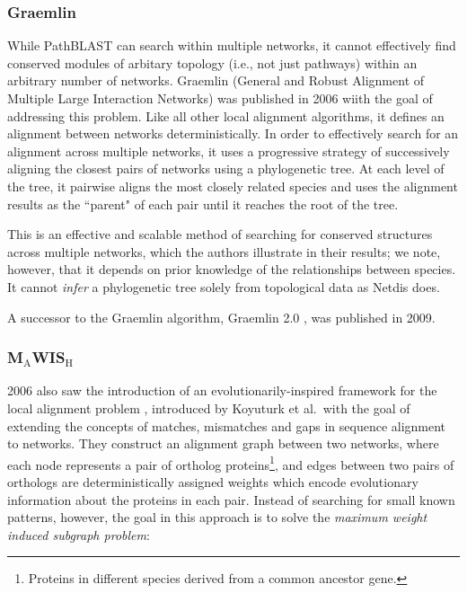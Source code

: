 \documentclass[12pt]{thesis}
\theoremstyle{plain}
\theoremstyle{definition}
\theoremstyle{remark}
\begin{document}
\subsubsection{Graemlin} While PathBLAST can search within multiple networks, it cannot effectively find conserved modules of arbitary topology (i.e., not just pathways) within an arbitrary number of networks. Graemlin (General and Robust Alignment of Multiple Large Interaction Networks) \cite{flannick2006graemlin} was published in 2006 wiith the goal of addressing this problem. Like all other local alignment algorithms, it defines an alignment between networks deterministically. In order to effectively search for an alignment across multiple networks, it uses a progressive strategy of successively aligning the closest pairs of networks using a phylogenetic tree. At each level of the tree, it pairwise aligns the most closely related species and uses the alignment results as the ``parent" of each pair until it reaches the root of the tree. 

This is an effective and scalable method of searching for conserved structures across multiple networks, which the authors illustrate in their results; we note, however, that it depends on prior knowledge of the relationships between species. It cannot \textit{infer} a phylogenetic tree solely from topological data as Netdis does.

A successor to the Graemlin algorithm, Graemlin 2.0 \cite{flannick2009automatic}, was published in 2009.

\subsubsection{M$_\text{A}$WIS$_\text{H}$} 2006 also saw the introduction of an evolutionarily-inspired framework for the local alignment problem \cite{Koyuturk_2006}, introduced by Koyuturk et al.\ with the goal of extending the concepts of matches, mismatches and gaps in sequence alignment to networks. They construct an alignment graph between two networks, where each node represents a pair of ortholog proteins\footnote{Proteins in different species derived from a common ancestor gene.}, and edges between two pairs of orthologs are deterministically assigned weights which encode evolutionary information about the proteins in each pair. Instead of searching for small known patterns, however, the goal in this approach is to solve the \textit{maximum weight induced subgraph problem}:
\end{document}
